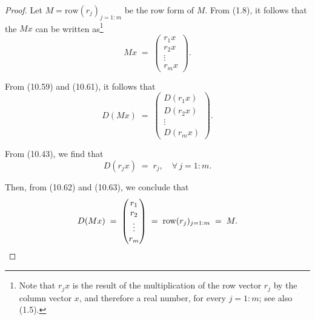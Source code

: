 \begin{proof}
Let $M = \mathrm{row}(r_j)_{j=1:m}$ be the row form of $M$. From (1.8), it follows
that the $Mx$ can be written as\footnote{Note that $r_jx$ is the result of the
multiplication of the row vector $r_j$ by the column vector $x$, and therefore a
real number, for every $j = 1:m$; see also (1.5).}
\begin{equation}
Mx \;=\; \begin{pmatrix} r_1x \\ r_2x \\ \vdots \\ r_mx \end{pmatrix}.
\end{equation}

From (10.59) and (10.61), it follows that
\begin{equation}
D(Mx) \;=\; \begin{pmatrix} D(r_1x) \\ D(r_2x) \\ \vdots \\ D(r_mx) \end{pmatrix}.
\end{equation}

From (10.43), we find that
\begin{equation}
D(r_jx) \;=\; r_j, \quad \forall\, j = 1:m.
\end{equation}

Then, from (10.62) and (10.63), we conclude that
\[
D(Mx) \;=\; \begin{pmatrix} r_1 \\ r_2 \\ \vdots \\ r_m \end{pmatrix}
\;=\; \mathrm{row}(r_j)_{j=1:m} \;=\; M.
\qedhere
\]
\end{proof}

